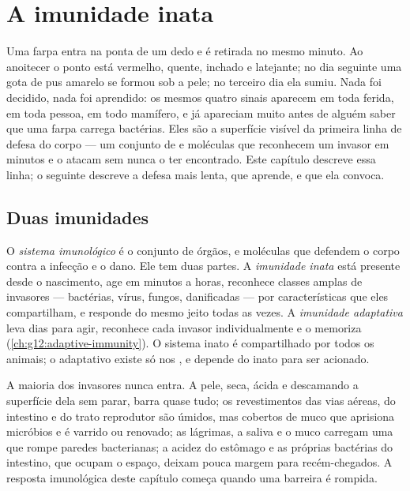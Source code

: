 \chapter{A imunidade inata}\label{ch:g12:innate-immunity}

Uma farpa entra na ponta de um dedo e é retirada no mesmo minuto. Ao
anoitecer o ponto está vermelho, quente, inchado e latejante; no dia
seguinte uma gota de pus amarelo se formou sob a pele; no terceiro dia
ela sumiu. Nada foi decidido, nada foi aprendido: os mesmos quatro
sinais aparecem em toda ferida, em toda pessoa, em todo mamífero, e já
apareciam muito antes de alguém saber que uma farpa carrega bactérias.
Eles são a superfície visível da primeira linha de defesa do corpo ---
um conjunto de  e moléculas que reconhecem um invasor em minutos
e o atacam sem nunca o ter encontrado. Este capítulo descreve essa
linha; o seguinte descreve a defesa mais lenta, que aprende, e que ela convoca.

\section{Duas imunidades}

\begin{definition}\label{def:g12:innate-immunity:immunity}
O \emph{sistema imunológico} é o conjunto de
órgãos,  e moléculas que defendem o corpo contra a infecção e o
dano. Ele tem duas partes. A \emph{imunidade inata}
está presente desde o nascimento, age em minutos a horas,
reconhece classes amplas de invasores --- bactérias, vírus, fungos,
 danificadas --- por características que eles compartilham, e
responde do mesmo jeito todas as vezes. A \emph{imunidade
adaptativa} leva dias para agir, reconhece
cada invasor individualmente e o memoriza
(\cref{ch:g12:adaptive-immunity}). O sistema inato é compartilhado por
todos os animais; o adaptativo existe só nos , e depende do
inato para ser acionado.
\end{definition}

\begin{proposition}\label{prop:g12:innate-immunity:barriers}
A maioria dos invasores nunca entra. A pele, seca, ácida e descamando a
superfície dela sem parar, barra quase tudo; os revestimentos das vias
aéreas, do intestino e do trato reprodutor são úmidos, mas cobertos de
muco que aprisiona micróbios e é varrido ou renovado; as lágrimas, a
saliva e o muco carregam uma  que rompe paredes bacterianas; a
acidez do estômago e as próprias bactérias do intestino, que ocupam o
espaço, deixam pouca margem para recém-chegados. A resposta imunológica
deste capítulo começa quando uma barreira é rompida.
\end{proposition}
\admitted

